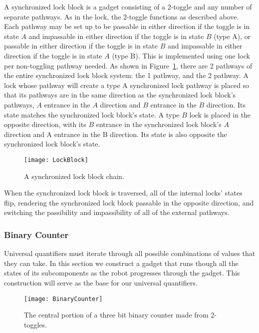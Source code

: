 A synchronized lock block is a gadget consisting of a 2-toggle and any number of separate pathways. As in the
lock, the 2-toggle functions as described above. Each pathway may be set up to be passable in either direction
if the toggle is in state $A$ and impassable in either direction if the toggle is in state $B$ (type A), or
passable in either direction if the toggle is in state $B$ and impassable in either direction if the
toggle is in state $A$ (type B). This is
implemented using one lock per non-toggling pathway needed. As shown in Figure~\ref{fig:LockBlock}, there are 2
pathways of the entire synchronized lock block system: the 1 pathway, and the 2 pathway. A lock whose pathway will create
a type A synchronized lock pathway is placed so that its pathways are in the same direction as the synchronized lock block's
pathways, $A$ entrance in the $A$ direction and $B$ entrance in the $B$ direction. Its state matches the 
synchronized lock block's
state.
A type $B$ lock is placed in the opposite direction, with its $B$ entrance in the synchronized lock block's $A$ direction and
A entrance in the B direction. Its state is also opposite the synchronized lock block's state.

\begin{figure}[h!]
\centering
    \texttt{[image: LockBlock]}
    \caption{A synchronized lock block chain.}
    \label{fig:LockBlock}
\end{figure}

When the synchronized lock block is traversed, all of the internal locks' states flip, rendering the synchronized lock block passable in the opposite direction, and switching the passibility and impassibility of all of the external pathways.

\subsubsection{Binary Counter}

Universal quantifiers must iterate through all possible combinations of values that they can take. In this section we construct a gadget that runs though all the states of its subcomponents as the robot progresses through the gadget. This construction will serve as the base for our universal quantifiers.

\begin{figure}[h!]
\centering
    \texttt{[image: BinaryCounter]}
    \caption{The central portion of a three bit binary counter made from 2-toggles.}
    \label{fig:BinaryCounter}
\end{figure}
  
